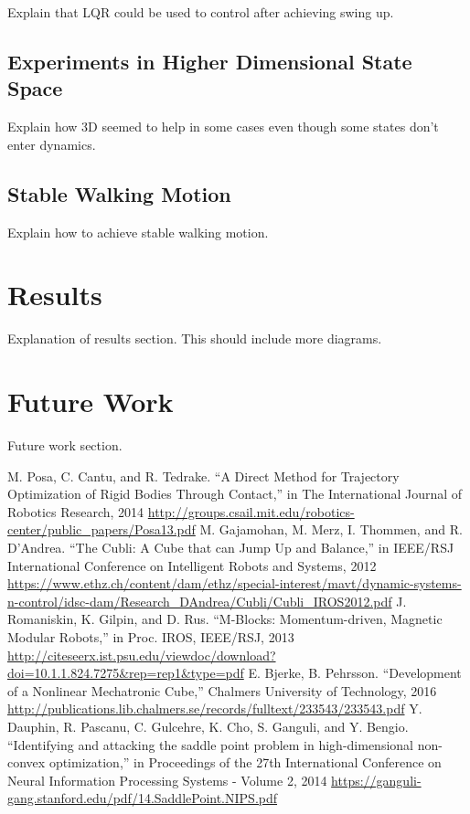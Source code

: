 \documentclass[conference]{IEEEtran}
\begin{document}
Explain that LQR could be used to control after achieving swing up.

\subsection{Experiments in Higher Dimensional State Space}
Explain how 3D seemed to help in some cases even though some states don't enter dynamics.

\subsection{Stable Walking Motion}

Explain how to achieve stable walking motion.

\section*{Results}

Explanation of results section. This should include more diagrams.

\section*{Future Work}

Future work section.

\begin{thebibliography}{00}
 M. Posa, C. Cantu, and R. Tedrake. ``A Direct Method for Trajectory Optimization of Rigid Bodies Through Contact,'' in The International Journal of Robotics Research, 2014 \url{http://groups.csail.mit.edu/robotics-center/public_papers/Posa13.pdf}
 M. Gajamohan, M. Merz, I. Thommen, and R. D'Andrea. ``The Cubli: A Cube that can Jump Up and Balance,'' in IEEE/RSJ International Conference on
Intelligent Robots and Systems, 2012 \url{https://www.ethz.ch/content/dam/ethz/special-interest/mavt/dynamic-systems-n-control/idsc-dam/Research_DAndrea/Cubli/Cubli_IROS2012.pdf}
 J. Romaniskin, K. Gilpin, and D. Rus. ``M-Blocks: Momentum-driven, Magnetic Modular Robots,'' in Proc. IROS, IEEE/RSJ, 2013
\url{http://citeseerx.ist.psu.edu/viewdoc/download?doi=10.1.1.824.7275&rep=rep1&type=pdf}
 E. Bjerke, B. Pehrsson. ``Development of a Nonlinear Mechatronic Cube,'' Chalmers University of Technology, 2016
\url{http://publications.lib.chalmers.se/records/fulltext/233543/233543.pdf}
 Y. Dauphin, R. Pascanu, C. Gulcehre, K. Cho, S. Ganguli, and Y. Bengio. ``Identifying and attacking the saddle point problem in high-dimensional non-convex optimization,'' in Proceedings of the 27th International Conference on Neural Information Processing Systems - Volume 2, 2014
\url{https://ganguli-gang.stanford.edu/pdf/14.SaddlePoint.NIPS.pdf}
\end{thebibliography}
\vspace{12pt}
\end{document}
